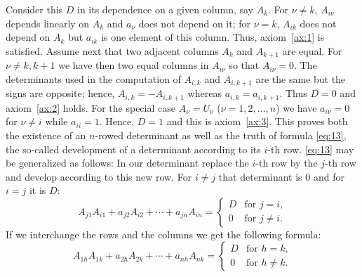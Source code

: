 \documentclass[10pt,leqno]{article}
\theoremstyle{definition}
\begin{document}
Consider this $D$ in its dependence on a given column, say $A_k$.
For $\nu \not= k$, $A_{i\nu}$ depends linearly on $A_k$ and $a_\nu$ does not depend on it; for $\nu = k$, $A_{ik}$ does not depend on $A_k$ but $a_{ik}$ is one element of this column.
Thus, axiom~\ref{ax:1} is satisfied.
Assume next that two adjacent columns $A_k$ and $A_{k+1}$ are equal.
For $\nu \not= k, k+1$ we have then two equal columns in $A_{i\nu}$ so that $A_{i\nu} = 0$.
The determinants used in the computation of $A_{i,k}$ and $A_{i,k+1}$ are the same but the signs are opposite; hence, $A_{i,k} = -A_{i,k+1}$ whereas $a_{i,k} = a_{i,k+1}$.
Thus $D = 0$ and axiom~\ref{ax:2} holds.
For the special case $A_{\nu} = U_\nu$ ($\nu = 1,2,\ldots,n$) we have $a_{i\nu} = 0$ for $\nu \not= i$ while $a_{ii} = 1$.
Hence, $D = 1$ and this is axiom~\ref{ax:3}.
This proves both the existence of an $n$-rowed determinant as well as the truth of formula \eqref{eq:13}, the so-called development of a determinant according to its $i$-th row.
\eqref{eq:13} may be generalized as follows:
In our determinant replace the $i$-th row by the $j$-th row and develop according to this new row.
For $i \not= j$ that determinant is $0$ and for $i = j$ it is $D$:
\begin{equation}
\label{eq:14}
A_{j1} A_{i1} + a_{j2} A_{i2} + \cdots + a_{jn} A_{in}
= \begin{cases}
D & \text{for $j = i$,}
\\
0 & \text{for $j \not= i$.}
\end{cases}
\end{equation}
If we interchange the rows and the columns we get the following formula:
\begin{equation}
\label{eq:15}
A_{1h} A_{1k} + a_{2h} A_{2k} + \cdots + a_{nh} A_{nk}
= \begin{cases}
D & \text{for $h = k$,}
\\
0 & \text{for $h \not= k$.}
\end{cases}
\end{equation}
\end{document}
